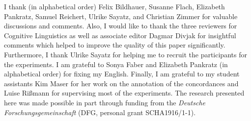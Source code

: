 \documentclass[UKenglish]{article}
\begin{document}
\begin{acknowledgement}
  I thank (in alphabetical order) Felix Bildhauer, Susanne Flach, Elizabeth Pankratz, Samuel Reichert, Ulrike Sayatz, and Christian Zimmer for valuable discussions and comments.
  Also, I would like to thank the three reviewers for Cognitive Linguistics as well as associate editor Dagmar \mbox{Divjak} for insightful comments which helped to improve the quality of this paper significantly.
  Furthermore, I thank Ulrike Sayatz for helping me to recruit the participants for the experiments.
  I am grateful to Sonya Faber and Elizabeth Pankratz (in alphabetical order) for fixing my English.
  Finally, I am grateful to my student assistants Kim Maser for her work on the annotation of the concordances and Luise Rißmann for supervising most of the experiments.
  The research presented here was made possible in part through funding from the \textit{Deutsche Forschungsgemeinschaft} (DFG, personal grant SCHA1916/1-1).
\end{acknowledgement}



\end{document}
